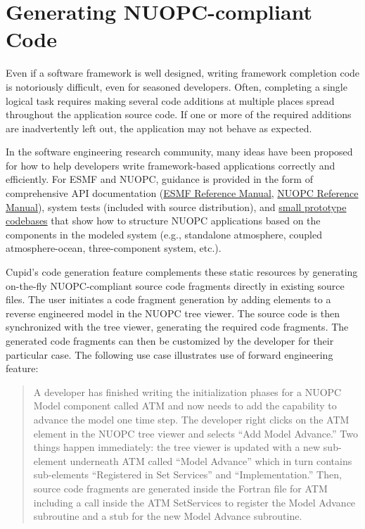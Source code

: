\documentclass[oneside,11pt]{memoir}
\begin{document}
\chapter{Generating NUOPC-compliant Code}

Even if a software framework is well designed, writing framework completion code is notoriously difficult, even for seasoned developers. Often, completing a single logical task requires making several code additions at multiple places spread throughout the application source code. If one or more of the required additions are inadvertently left out, the application may not behave as expected.  

In the software engineering research community, many ideas have been proposed for how to help developers write framework-based applications correctly and efficiently. For ESMF and NUOPC, guidance is provided in the form of comprehensive API documentation (\href{http://www.earthsystemmodeling.org/esmf_releases/public/last/ESMF_refdoc/}{ESMF Reference Manual}, \href{https://earthsystemcog.org/projects/nuopc/refmans}{NUOPC Reference Manual}), system tests (included with source distribution), and \href{https://earthsystemcog.org/projects/nuopc/proto_codes}{small prototype codebases} that show how to structure NUOPC applications based on the components in the modeled system (e.g., standalone atmosphere, coupled atmosphere-ocean, three-component system, etc.). 

Cupid's code generation feature complements these static resources by generating on-the-fly NUOPC-compliant source code fragments directly in existing source files. The user initiates a code fragment generation by adding elements to a reverse engineered model in the NUOPC tree viewer. The source code is then synchronized with the tree viewer, generating the required code fragments. The generated code fragments can then be customized by the developer for their particular case. The following use case illustrates use of forward engineering feature:

\begin{quote}
A developer has finished writing the initialization phases for a NUOPC Model component called ATM and now needs to add the capability to advance the model one time step. The developer right clicks on the ATM element in the NUOPC tree viewer and selects ``Add Model Advance.''  Two things happen immediately: the tree viewer is updated with a new sub-element underneath ATM called ``Model Advance'' which in turn contains sub-elements ``Registered in Set Services'' and ``Implementation.'' Then, source code fragments are generated inside the Fortran file for ATM including a call inside the ATM SetServices to register the Model Advance subroutine and a stub for the new Model Advance subroutine.
\end{quote}
\end{document}
